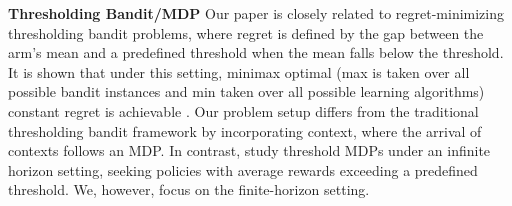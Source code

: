 \textbf{Thresholding Bandit/MDP\;\;} 
Our paper is closely related to regret-minimizing thresholding bandit problems, where regret is defined by the gap between the arm's mean and a predefined threshold when the mean falls below the threshold.
It is shown that under this setting, minimax optimal (max is taken over all possible bandit instances and min taken over all possible learning algorithms) constant regret is achievable \citep{tamatsukuri2019guaranteed,michel2022regret,feng2024satisficing}. 
Our problem setup differs from the traditional thresholding bandit framework by incorporating context, where the arrival of contexts follows an MDP.
In contrast, \citet{hajiabolhassan2023online} study threshold MDPs under an infinite horizon setting, seeking policies with average rewards exceeding a predefined threshold. We, however, focus on the finite-horizon setting.


